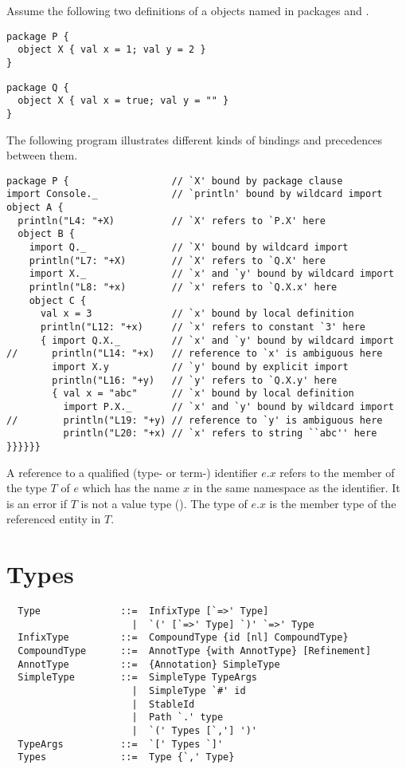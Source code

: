 \example Assume the following two definitions of a objects named \lstinline@X@ in packages \lstinline@P@ and \lstinline@Q@.
\begin{lstlisting}
package P {
  object X { val x = 1; val y = 2 }
}
\end{lstlisting}
\begin{lstlisting}
package Q {
  object X { val x = true; val y = "" }
}
\end{lstlisting}
The following program illustrates different kinds of bindings and
precedences between them.
\begin{lstlisting}
package P {                  // `X' bound by package clause
import Console._             // `println' bound by wildcard import
object A {                   
  println("L4: "+X)          // `X' refers to `P.X' here
  object B {
    import Q._               // `X' bound by wildcard import
    println("L7: "+X)        // `X' refers to `Q.X' here
    import X._               // `x' and `y' bound by wildcard import
    println("L8: "+x)        // `x' refers to `Q.X.x' here
    object C {
      val x = 3              // `x' bound by local definition
      println("L12: "+x)     // `x' refers to constant `3' here
      { import Q.X._         // `x' and `y' bound by wildcard import
//      println("L14: "+x)   // reference to `x' is ambiguous here
        import X.y           // `y' bound by explicit import
        println("L16: "+y)   // `y' refers to `Q.X.y' here
        { val x = "abc"      // `x' bound by local definition
          import P.X._       // `x' and `y' bound by wildcard import
//        println("L19: "+y) // reference to `y' is ambiguous here
          println("L20: "+x) // `x' refers to string ``abc'' here
}}}}}}
\end{lstlisting}

A reference to a qualified (type- or term-) identifier $e.x$ refers to
the member of the type $T$ of $e$ which has the name $x$ in the same
namespace as the identifier. It is an error if $T$ is not a value type
(). The type of $e.x$ is the member type of the
referenced entity in $T$.

\chapter{\label{sec:types}Types}

\syntax\begin{lstlisting}
  Type              ::=  InfixType [`=>' Type]
                      |  `(' [`=>' Type] `)' `=>' Type
  InfixType         ::=  CompoundType {id [nl] CompoundType}
  CompoundType      ::=  AnnotType {with AnnotType} [Refinement]
  AnnotType         ::=  {Annotation} SimpleType
  SimpleType        ::=  SimpleType TypeArgs
                      |  SimpleType `#' id
                      |  StableId
                      |  Path `.' type
                      |  `(' Types [`,'] ')'
  TypeArgs          ::=  `[' Types `]'
  Types             ::=  Type {`,' Type}
\end{lstlisting}

